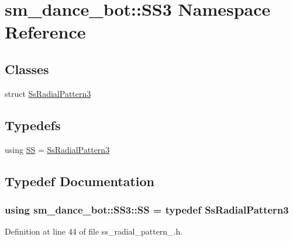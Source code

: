 \hypertarget{namespacesm__dance__bot_1_1SS3}{}\section{sm\+\_\+dance\+\_\+bot\+:\+:S\+S3 Namespace Reference}
\label{namespacesm__dance__bot_1_1SS3}
\subsection*{Classes}
\begin{DoxyCompactItemize}
\item 
struct \hyperlink{structsm__dance__bot_1_1SS3_1_1SsRadialPattern3}{Ss\+Radial\+Pattern3}
\end{DoxyCompactItemize}
\subsection*{Typedefs}
\begin{DoxyCompactItemize}
\item 
using \hyperlink{namespacesm__dance__bot_1_1SS3_aba7ea37bc21bc69fc2c374bd831c7ab1}{SS} = \hyperlink{structsm__dance__bot_1_1SS3_1_1SsRadialPattern3}{Ss\+Radial\+Pattern3}
\end{DoxyCompactItemize}


\subsection{Typedef Documentation}
\subsubsection[{\texorpdfstring{SS}{SS}}]{\setlength{\rightskip}{0pt plus 5cm}using {\bf sm\+\_\+dance\+\_\+bot\+::\+S\+S3\+::\+SS} = typedef {\bf Ss\+Radial\+Pattern3}}\hypertarget{namespacesm__dance__bot_1_1SS3_aba7ea37bc21bc69fc2c374bd831c7ab1}{}\label{namespacesm__dance__bot_1_1SS3_aba7ea37bc21bc69fc2c374bd831c7ab1}


Definition at line 44 of file ss\+\_\+radial\+\_\+pattern\+\_.\+h.

